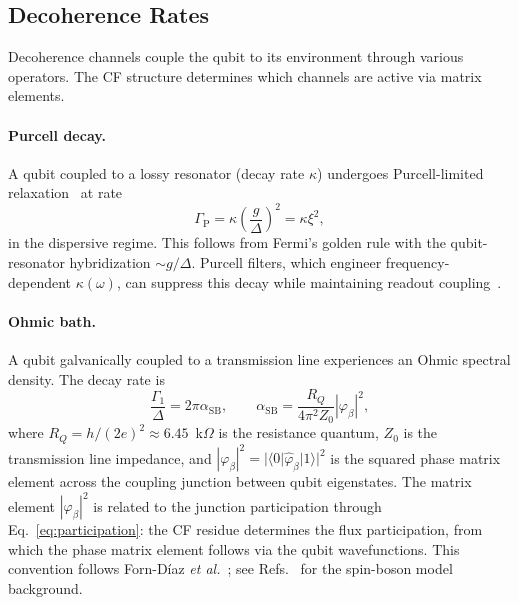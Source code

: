 \documentclass[reprint, floatfix, superscriptaddress, amsmath, amssymb, longbibliography]{revtex4-2}
\begin{document}
\subsection{Decoherence Rates}
\label{sec:decoherence}

Decoherence channels couple the qubit to its environment through various operators. The CF structure determines which channels are active via matrix elements.

\paragraph{Purcell decay.} A qubit coupled to a lossy resonator (decay rate $\kappa$) undergoes Purcell-limited relaxation~\cite{Purcell1946} at rate
\begin{equation}
\Gamma_{\mathrm{P}} = \kappa \left(\frac{g}{\Delta}\right)^2 = \kappa\xi^2,
\label{eq:purcell}
\end{equation}
in the dispersive regime. This follows from Fermi's golden rule with the qubit-resonator hybridization $\sim g/\Delta$. Purcell filters, which engineer frequency-dependent $\kappa(\omega)$, can suppress this decay while maintaining readout coupling~\cite{Reed2010, Jeffrey2014}.

\paragraph{Ohmic bath.} A qubit galvanically coupled to a transmission line 
experiences an Ohmic spectral density. The decay rate is
\begin{equation}
\frac{\Gamma_1}{\Delta} = 2\pi\alpha_{\mathrm{SB}}, \qquad 
\alpha_{\mathrm{SB}} = \frac{R_Q}{4\pi^2 Z_0}|\varphi_\beta|^2,
\label{eq:ohmic_decay}
\end{equation}
where $R_Q = h/(2e)^2 \approx 6.45$~k$\Omega$ is the resistance quantum, 
$Z_0$ is the transmission line impedance, and 
$|\varphi_\beta|^2 = |\langle 0|\hat{\varphi}_\beta|1\rangle|^2$ is the squared 
phase matrix element across the coupling junction between qubit eigenstates. 
The matrix element $|\varphi_\beta|^2$ is related to the junction participation 
through Eq.~\eqref{eq:participation}: the CF residue determines the flux 
participation, from which the phase matrix element follows via the qubit 
wavefunctions. This convention follows Forn-D\'iaz \textit{et al.}~\cite{FornDiaz2017}; 
see Refs.~\cite{Leggett1987, Weiss2012} for the spin-boson model background.
\end{document}
